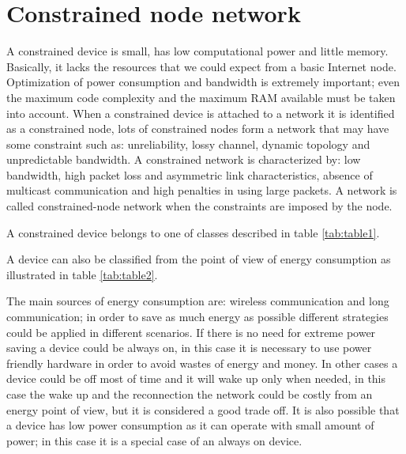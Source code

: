 	\section{Constrained node network}
	A constrained device is small, has low computational power and little memory.
	Basically, it lacks the resources that we could expect from a basic Internet node.\newline
	Optimization of power consumption and bandwidth is extremely important; even the maximum code complexity and the maximum RAM available must be taken into account.\newline
	When a constrained device is attached to a network it is identified as a constrained node, lots of constrained nodes form a network that may have some constraint such as: unreliability, lossy channel, dynamic topology and unpredictable bandwidth.\newline
	A constrained network is characterized by: low bandwidth, high packet loss and asymmetric link characteristics, absence of multicast communication and high penalties in using large packets.\newline
	A network is called constrained-node network when the constraints are imposed by the node.
	
	
	
	A constrained device belongs to one of classes described in table \ref{tab:table1}.\newline
	
	
	A device can also be classified from the point of view of energy consumption as illustrated in table \ref{tab:table2}.
	
	The main sources of energy consumption are: wireless communication and long communication; in order to save as much energy as possible different strategies could be applied in different scenarios.\newline
	If there is no need for extreme power saving a device could be always on, in this case it is necessary to use power friendly hardware in order to avoid wastes of energy and money.\newline
	In other cases a device could be off most of time and it will wake up only when needed, in this case the wake up and the reconnection the network
	could be costly from an energy point of view, but it is considered a good trade off.\newline
	It is also possible that a device has low power consumption as it can operate with small amount of power; in this case it is a special case of an always on device.
